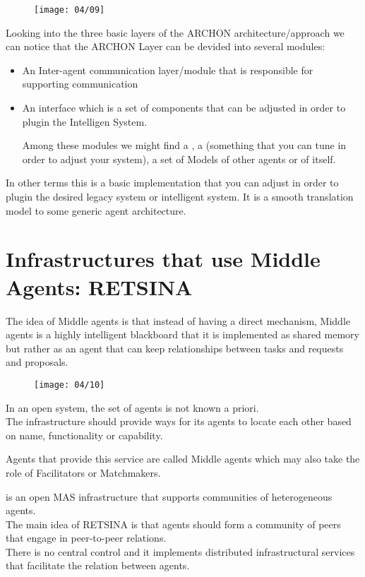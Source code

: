 \begin{figure}[!h]
\centering
\texttt{[image: 04/09]}
\end{figure}

Looking into the three basic layers of the ARCHON architecture/approach we can notice that the ARCHON Layer can be devided into several modules:
\begin{itemize}
\item An Inter-agent communication layer/module that is responsible for supporting communication
\item An interface which is a set of components that can be adjusted in order to plugin the Intelligen System.

Among these modules we might find a , a  (something that you can tune in order to adjust your system), a set of Models of other agents or of itself.
\end{itemize}

In other terms this is a basic implementation that you can adjust in order to plugin the desired legacy system or intelligent system. It is a smooth translation model to some generic agent architecture.

\section{Infrastructures that use Middle Agents: RETSINA}
The idea of Middle agents is that instead of having a direct mechanism, Middle agents is a highly intelligent blackboard that it is implemented as shared memory but rather as an agent that can keep relationships between tasks and requests and proposals.

\begin{figure}[!h]
\centering
\texttt{[image: 04/10]}
\end{figure}

In an open system, the set of agents is not known a priori.\\
The infrastructure should provide ways for its agents to locate each other based on name, functionality or capability.

Agents that provide this service are called Middle agents which may also take the role of Facilitators or Matchmakers.

 is an open MAS infrastructure that supports communities of heterogeneous agents.\\
The main idea of RETSINA is that agents should form a community of peers that engage in peer-to-peer relations.\\
There is no central control and it implements distributed infrastructural services that facilitate the relation between agents.

